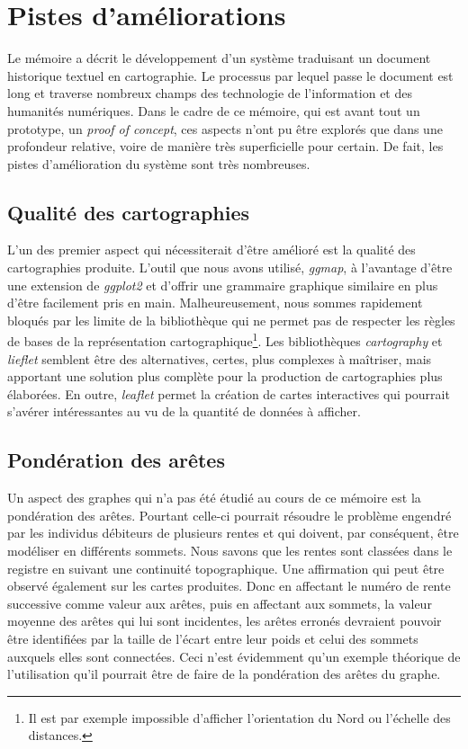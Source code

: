 \section{Pistes d'améliorations}
Le mémoire a décrit le développement d'un système traduisant un document historique textuel en cartographie. Le processus par lequel passe le document est long  et traverse nombreux champs des technologie de l'information et des humanités numériques. Dans le cadre de ce  mémoire, qui est avant tout un prototype, un \textit{proof of concept}, ces aspects n'ont pu être explorés que dans une profondeur relative, voire de manière très superficielle pour certain. De fait, les pistes d'amélioration du système sont très nombreuses.



\subsection{Qualité des cartographies}
L'un des premier aspect qui nécessiterait d'être amélioré est la qualité des cartographies produite. L'outil que nous avons utilisé, \textit{ggmap}, à l'avantage d'être une extension de \textit{ggplot2} et d'offrir une grammaire graphique similaire en plus d'être facilement pris en main. Malheureusement, nous sommes rapidement bloqués par les limite de la bibliothèque qui ne permet pas de respecter les règles de bases de la représentation cartographique\footnote{Il est par exemple impossible d'afficher l'orientation du Nord ou l'échelle des distances.}. 
Les bibliothèques \textit{cartography} et \textit{lieflet} semblent être des alternatives, certes, plus complexes à maîtriser, mais apportant une solution plus complète pour la production de cartographies plus élaborées.
En outre, \textit{leaflet} permet la création de cartes interactives qui pourrait s'avérer intéressantes au vu de la quantité de données à afficher.


\subsection{Pondération des arêtes}
Un aspect des graphes qui n'a pas été étudié au cours de ce mémoire est la pondération des arêtes. Pourtant celle-ci pourrait résoudre le problème engendré par les individus débiteurs de plusieurs rentes et qui doivent, par conséquent,  être modéliser en différents sommets. Nous savons que les rentes sont classées dans le registre en suivant une continuité topographique. Une affirmation qui peut être observé également sur les cartes  produites. 
Donc en affectant le numéro de rente successive comme valeur aux arêtes, puis en affectant aux sommets, la valeur moyenne des arêtes qui lui sont incidentes, les arêtes erronés devraient pouvoir être identifiées par la taille de l'écart entre leur poids et celui des sommets auxquels elles sont connectées. Ceci n'est évidemment qu'un exemple théorique de l'utilisation qu'il pourrait être de faire de la pondération des arêtes du graphe.

